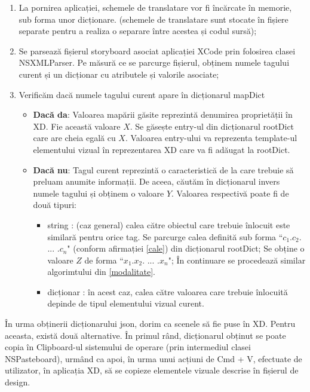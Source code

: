 \begin{enumerate}
\item La pornirea aplicației, schemele de translatare vor fi încărcate în memorie, sub forma unor dicționare. (schemele de translatare sunt stocate în fișiere separate pentru a realiza o separare între acestea și codul sursă);
\item Se parsează fișierul storyboard asociat aplicației XCode prin folosirea clasei NSXMLParser. Pe măsură ce se parcurge fișierul, obținem numele tagului curent și un dicționar cu atributele și valorile asociate;
\item Verificăm dacă numele tagului curent apare în dicționarul mapDict
\begin{itemize}
\item \textbf{Dacă da}: Valoarea mapării găsite reprezintă denumirea proprietății în XD. Fie această valoare $X$. Se găsește entry-ul din dicționarul rootDict care are cheia egală cu $X$. Valoarea entry-ului va reprezenta template-ul elementului vizual în reprezentarea XD care va fi adăugat la rootDict.
\item \textbf{Dacă nu}: Tagul curent reprezintă o caracteristică de la care trebuie să preluam anumite informații. De aceea, căutăm în dicționarul invers numele tagului și obținem o valoare $Y$. Valoarea respectivă poate fi de două tipuri:
\begin{itemize}
\item string : (caz general) calea către obiectul care trebuie înlocuit este similară pentru orice tag. Se parcurge calea definită sub forma ``$c_1$.$c_2$. ... .$c_n$" (conform afirmației \ref{cale}) din dicționarul rootDict; Se obține o valoare $Z$ de forma ``$x_1$.$x_2$. ... .$x_n$"; În continuare se procedează similar algorimtului din \ref{modalitate}.
\item dicționar : în acest caz, calea către valoarea care trebuie înlocuită depinde de tipul elementului vizual curent. 
\end{itemize}
\end{itemize}
\end{enumerate}

În urma obținerii dicționarului json, dorim ca scenele să fie puse în XD. Pentru aceasta, există două alternative. În primul rând, dicționarul obținut se poate copia în Clipboard-ul sistemului de operare (prin intermediul clasei NSPasteboard), urmând ca apoi, în urma unui acțiuni de Cmd + V, efectuate de utilizator, în aplicația XD, să se copieze elementele vizuale descrise în fișierul de design.

